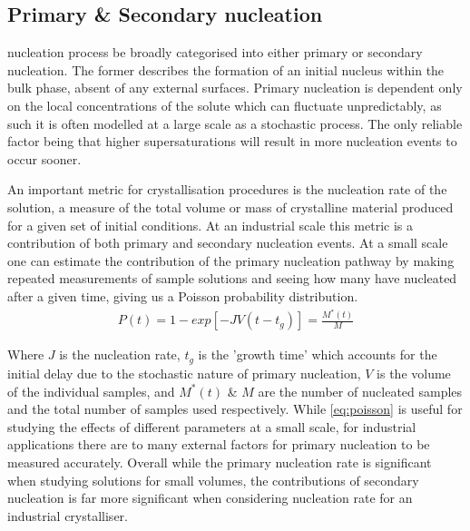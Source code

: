 \subsection{Primary \& Secondary nucleation}
nucleation process be broadly categorised into either primary 
or secondary nucleation. The former describes the formation 
of an initial nucleus within the bulk phase, absent of any 
external surfaces. Primary nucleation is dependent only on 
the local concentrations of the solute which can fluctuate 
unpredictably, as such it is often modelled at a large scale 
as a stochastic process. The only reliable factor being 
that higher supersaturations will result in more nucleation 
events to occur sooner.

An important metric for crystallisation procedures is the 
nucleation rate of the solution, a measure of the total 
volume or mass of crystalline material produced for a given 
set of initial conditions. At an industrial scale this 
metric is a contribution of both primary and secondary 
nucleation events. At a small scale one can estimate the 
contribution of the primary nucleation pathway by making 
repeated measurements of sample solutions and seeing how 
many have nucleated after a given time, giving us a Poisson 
probability distribution.
\begin{align}
	P(t) = 1 - exp\left[-JV(t-t_g)\right] = \frac{M^*(t)}{M}
	\label{eq:poisson}
\end{align}

Where $J$ is the nucleation rate, $t_g$ is the 'growth time' 
which accounts for the initial delay due to the stochastic 
nature of primary nucleation, $V$ is the volume of the individual 
samples, and $M^*(t)$ \& $M$ are the number of nucleated samples 
and the total number of samples used respectively. While 
\eqref{eq:poisson} is useful for studying the effects of different 
parameters at a small scale, for industrial applications there are 
to many external factors for primary nucleation to be measured 
accurately. Overall while the primary nucleation rate is significant 
when studying solutions for small volumes, the contributions of 
secondary nucleation is far more significant when considering 
nucleation rate for an industrial crystalliser.

